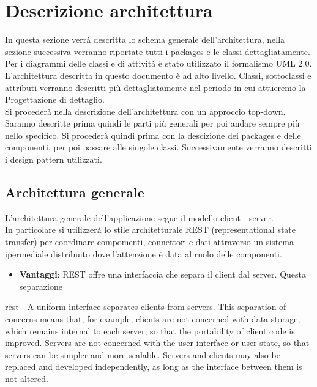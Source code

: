 \section{Descrizione architettura} 
\label{architettura}
	In questa sezione verrà descritta lo schema generale dell'architettura, nella sezione successiva %
	verranno riportate tutti i packages e le classi dettagliatamente.
	 Per i diagrammi delle classi e di attività è stato utilizzato il formalismo UML 2.0. \\
	 L'architettura descritta in questo documento è ad alto livello. Classi, sottoclassi e attributi verranno descritti più dettagliatamente nel periodo in cui attueremo la Progettazione di dettaglio. \\
	 Si procederà nella descrizione dell'architettura con un approccio top-down. Saranno descritte prima quindi le parti più generali per poi andare sempre più nello specifico. Si procederà quindi prima con la descizione dei packages e delle componenti, per poi passare alle singole classi. Successivamente verranno descritti i design pattern utilizzati.
	
	\subsection{Architettura generale}
	L'architettura generale dell'applicazione segue il modello client - server. \\
	In particolare si utilizzerà lo stile architetturale REST (representational state transfer) per coordinare compomenti, connettori e dati attraverso un sistema ipermediale distribuito dove l'attenzione è data al ruolo delle componenti.
	
	\begin{itemize}
		\item \textbf{Vantaggi}: REST offre una interfaccia che separa il client dal server. Questa separazione 
	\end{itemize}
		
		rest - A uniform interface separates clients from servers. This separation of concerns means that, for example, clients are not concerned with data storage, which remains internal to each server, so that the portability of client code is improved. Servers are not concerned with the user interface or user state, so that servers can be simpler and more scalable. Servers and clients may also be replaced and developed independently, as long as the interface between them is not altered.